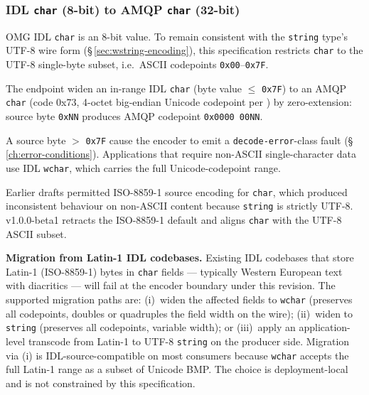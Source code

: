 \documentclass{../styles/zerodds-vendor-spec}
\begin{document}
\subsubsection{IDL \texttt{char} (8-bit) to AMQP \texttt{char} (32-bit)}\label{sec:char-encoding-detail}

OMG IDL \texttt{char} is an 8-bit value. To remain consistent with
the \texttt{string} type's UTF-8 wire form
(\S\,\ref{sec:wstring-encoding}), this specification restricts
\texttt{char} to the UTF-8 single-byte subset, i.e.\ ASCII
codepoints \texttt{0x00}--\texttt{0x7F}.

The endpoint  widen an in-range IDL \texttt{char}
(byte value $\le$ \texttt{0x7F}) to an AMQP \texttt{char} (code
\textsf{0x73}, 4-octet big-endian Unicode codepoint per
) by zero-extension: source
byte \texttt{0xNN} produces AMQP codepoint
\texttt{0x0000\,00NN}.

A source byte $>$ \texttt{0x7F}  cause the encoder
to emit a \texttt{decode-error}-class fault
(\S\,\ref{ch:error-conditions}). Applications that require
non-ASCII single-character data  use IDL
\texttt{wchar}, which carries the full Unicode-codepoint range.

\begin{specnote}
Earlier drafts permitted ISO-8859-1 source encoding for
\texttt{char}, which produced inconsistent behaviour on
non-ASCII content because \texttt{string} is strictly UTF-8.
v1.0.0-beta1 retracts the ISO-8859-1 default and aligns
\texttt{char} with the UTF-8 ASCII subset.
\end{specnote}

\begin{specnote}
\textbf{Migration from Latin-1 IDL codebases.} Existing IDL
codebases that store Latin-1 (ISO-8859-1) bytes in \texttt{char}
fields — typically Western European text with diacritics — will
fail at the encoder boundary under this revision. The supported
migration paths are: (i)~widen the affected fields to
\texttt{wchar} (preserves all codepoints, doubles or quadruples
the field width on the wire); (ii)~widen to \texttt{string}
(preserves all codepoints, variable width); or (iii)~apply an
application-level transcode from Latin-1 to UTF-8 \texttt{string}
on the producer side. Migration via (i) is IDL-source-compatible
on most consumers because \texttt{wchar} accepts the full Latin-1
range as a subset of Unicode BMP. The choice is deployment-local
and is not constrained by this specification.
\end{specnote}
\end{document}
